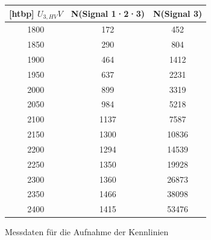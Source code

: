             \begin{figure}
                \centering
                \begin{tabular}{c|c|c}[htbp]
                    $U_{3,HV} \unit{V}$ & N(Signal 1·2·3) & N(Signal 3)  \\ 
                    \hline  1800 &  172 &   452\\
                    1850 &  290 &   804\\
                    1900 &  464 &  1412\\
                    1950 &  637 &  2231\\
                    2000 &  899 &  3319\\
                    2050 &  984 &  5218\\
                    2100 & 1137 &  7587\\
                    2150 & 1300 & 10836\\
                    2200 & 1294 & 14539\\
                    2250 & 1350 & 19928\\
                    2300 & 1360 & 26873\\
                    2350 & 1466 & 38098\\
                    2400 & 1415 & 53476\\
                \end{tabular} 
                \caption{Messdaten für die Aufnahme der Kennlinien}
                \label{ente}
            \end{figure}
